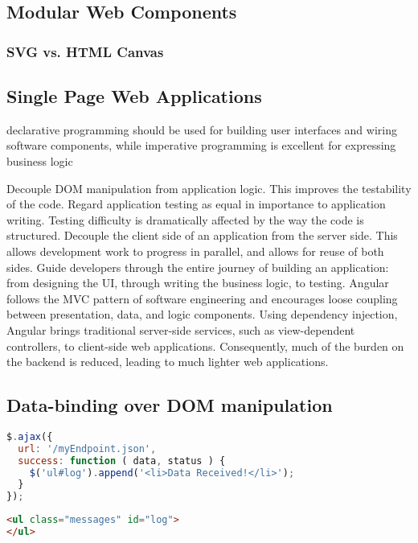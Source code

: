 \subsection{Modular Web Components}

\subsubsection{SVG vs. HTML Canvas}

\subsection{Single Page Web Applications}

declarative programming should be used for building user interfaces and wiring software components, while imperative programming is excellent for expressing business logic


Decouple DOM manipulation from application logic. This improves the testability of the code. Regard application testing as equal in importance to application writing. Testing difficulty is dramatically affected by the way the code is structured.
Decouple the client side of an application from the server side. This allows development work to progress in parallel, and allows for reuse of both sides.
Guide developers through the entire journey of building an application: from designing the UI, through writing the business logic, to testing.
Angular follows the MVC pattern of software engineering and encourages loose coupling between presentation, data, and logic components. Using dependency injection, Angular brings traditional server-side services, such as view-dependent controllers, to client-side web applications. Consequently, much of the burden on the backend is reduced, leading to much lighter web applications.

\subsection{Data-binding over DOM manipulation}

\begin{lstlisting}[language=JavaScript]
$.ajax({
  url: '/myEndpoint.json',
  success: function ( data, status ) {
    $('ul#log').append('<li>Data Received!</li>');
  }
});
\end{lstlisting}

\begin{lstlisting}[language=html]
<ul class="messages" id="log">
</ul>
\end{lstlisting}


